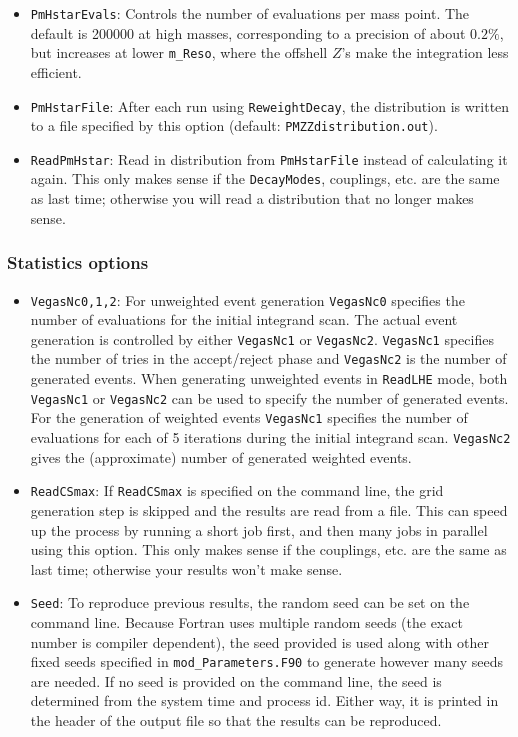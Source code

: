 \documentclass[aps,superscriptaddress,nofootinbib]{revtex4}
\begin{document}
\begin{itemize}
\begin{itemize}
\item \verb|PmHstarEvals|: Controls the number of evaluations per mass point.  The default is 200000 at high masses, corresponding to a precision of about $0.2\%$, but increases at lower \verb|m_Reso|, where the offshell $Z$'s make the integration less efficient.
\item \verb|PmHstarFile|: After each run using \verb|ReweightDecay|, the distribution is written to a file specified by this option (default: \verb|PMZZdistribution.out|).
\item \verb|ReadPmHstar|: Read in distribution from \verb|PmHstarFile| instead of calculating it again.  This only makes sense if the \verb|DecayModes|, couplings, etc. are the same as last time; otherwise you will read a distribution that no longer makes sense.
\end{itemize}
\subsubsection{Statistics options}
\begin{itemize}
\item \verb|VegasNc0,1,2|: For unweighted event generation \verb|VegasNc0| specifies the number of evaluations for the initial integrand scan.  The actual event generation is controlled by either \verb|VegasNc1| or \verb|VegasNc2|. \verb|VegasNc1| specifies the number of tries in the accept/reject phase and \verb|VegasNc2| is the number of generated events. When generating unweighted events in \verb|ReadLHE| mode, both \verb|VegasNc1| or \verb|VegasNc2| can be used to specify the number of generated events. For the generation of weighted events \verb|VegasNc1| specifies the number of evaluations for each of 5 iterations during the initial integrand scan. \verb|VegasNc2| gives the (approximate) number of generated weighted events.
\item \verb|ReadCSmax|: If \verb|ReadCSmax| is specified on the command line, the grid generation step is skipped and the results are read from a file.  This can speed up the process by running a short job first, and then many jobs in parallel using this option.  This only makes sense if the couplings, etc. are the same as last time; otherwise your results won't make sense.
\item \verb|Seed|: To reproduce previous results, the random seed can be set on the command line.  Because Fortran uses multiple random seeds (the exact number is compiler dependent), the seed provided is used along with other fixed seeds specified in \verb|mod_Parameters.F90| to generate however many seeds are needed.  If no seed is provided on the command line, the seed is determined from the system time and process id.  Either way, it is printed in the header of the output file so that the results can be reproduced.


\end{itemize}
\end{itemize}
\end{document}
